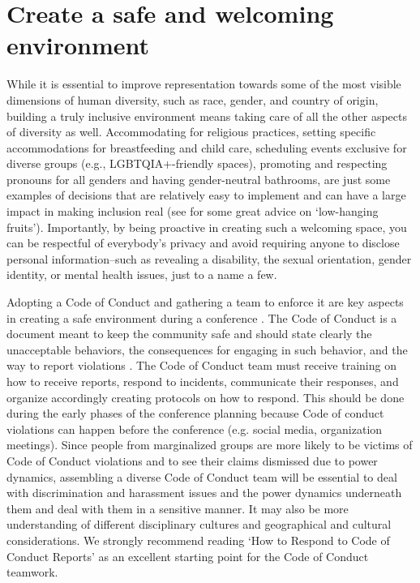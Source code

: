 \documentclass[10pt,letterpaper]{article}
\begin{document}
\section{Create a safe and welcoming environment}
\label{rule_inclusion}

While it is essential to improve representation towards some of the most visible dimensions of human diversity, such as race, gender, and country of origin, building a truly inclusive environment means taking care of all the other aspects of diversity as well. 
Accommodating for religious practices, setting specific accommodations for breastfeeding and child care, scheduling events exclusive for diverse groups (e.g., LGBTQIA+-friendly spaces), promoting and respecting pronouns for all genders and having gender-neutral bathrooms, are just some examples of decisions that are relatively easy to implement and can have a large impact in making inclusion real (see \cite{noauthor_discover2021} for some great advice on `low-hanging fruits').
Importantly, by being proactive in creating such a welcoming space, you can be respectful of everybody's privacy and avoid requiring anyone to disclose personal information–such as revealing a disability, the sexual orientation, gender identity, or mental health issues, just to a name a few.

Adopting a Code of Conduct and gathering a team to enforce it are key aspects in creating a safe environment during a conference \cite{favaroYourScienceConference2016}.
The Code of Conduct is a document meant to keep the community safe and should state clearly the unacceptable behaviors, the consequences for engaging in such behavior, and the way to report violations \cite{auroraHowRespondCode2019}. 
The Code of Conduct team must receive training on how to receive reports, respond to incidents, communicate their responses, and organize accordingly creating protocols on how to respond. This should be done during the early phases of the conference planning because Code of conduct violations can happen before the conference (e.g. social media, organization meetings).  
Since people from marginalized groups are more likely to be victims of Code of Conduct violations and to see their claims dismissed due to power dynamics, assembling a diverse Code of Conduct team will be essential to deal with discrimination and harassment issues and the power dynamics underneath them and deal with them in a sensitive manner. It may also be more understanding of different disciplinary cultures and geographical and cultural considerations. 
We strongly recommend reading `How to Respond to Code of Conduct Reports' \cite{auroraHowRespondCode2019} as an excellent starting point for the Code of Conduct teamwork.
 
\end{document}
